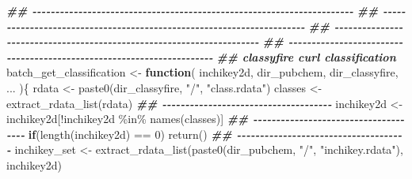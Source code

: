 \documentclass[
]{article}
\newenvironment{Shaded}{\begin{snugshade}}{\end{snugshade}}
\newcommand{\ControlFlowTok}[1]{\textcolor[rgb]{0.13,0.29,0.53}{\textbf{#1}}}
\newcommand{\DecValTok}[1]{\textcolor[rgb]{0.00,0.00,0.81}{#1}}
\newcommand{\DocumentationTok}[1]{\textcolor[rgb]{0.56,0.35,0.01}{\textbf{\textit{#1}}}}
\newcommand{\FunctionTok}[1]{\textcolor[rgb]{0.00,0.00,0.00}{#1}}
\newcommand{\NormalTok}[1]{#1}
\newcommand{\OtherTok}[1]{\textcolor[rgb]{0.56,0.35,0.01}{#1}}
\newcommand{\SpecialCharTok}[1]{\textcolor[rgb]{0.00,0.00,0.00}{#1}}
\newcommand{\StringTok}[1]{\textcolor[rgb]{0.31,0.60,0.02}{#1}}
\begin{document}
\begin{Shaded}
\begin{Highlighting}[]
\DocumentationTok{\#\# {-}{-}{-}{-}{-}{-}{-}{-}{-}{-}{-}{-}{-}{-}{-}{-}{-}{-}{-}{-}{-}{-}{-}{-}{-}{-}{-}{-}{-}{-}{-}{-}{-}{-}{-}{-}{-}{-}{-}{-}{-}{-}{-}{-}{-}{-}{-}{-}{-}{-}{-}{-}{-}{-}{-}{-}{-}{-}{-}{-}{-}{-}{-}{-}{-}{-}{-}{-}{-}{-} }
\DocumentationTok{\#\# {-}{-}{-}{-}{-}{-}{-}{-}{-}{-}{-}{-}{-}{-}{-}{-}{-}{-}{-}{-}{-}{-}{-}{-}{-}{-}{-}{-}{-}{-}{-}{-}{-}{-}{-}{-}{-}{-}{-}{-}{-}{-}{-}{-}{-}{-}{-}{-}{-}{-}{-}{-}{-}{-}{-}{-}{-}{-}{-}{-}{-}{-}{-}{-}{-}{-}{-}{-}{-}{-} }
\DocumentationTok{\#\# {-}{-}{-}{-}{-}{-}{-}{-}{-}{-}{-}{-}{-}{-}{-}{-}{-}{-}{-}{-}{-}{-}{-}{-}{-}{-}{-}{-}{-}{-}{-}{-}{-}{-}{-}{-}{-}{-}{-}{-}{-}{-}{-}{-}{-}{-}{-}{-}{-}{-}{-}{-}{-}{-}{-}{-}{-}{-}{-}{-}{-}{-}{-}{-}{-}{-}{-}{-}{-}{-} }
\DocumentationTok{\#\# {-}{-}{-}{-}{-}{-}{-}{-}{-}{-}{-}{-}{-}{-}{-}{-}{-}{-}{-}{-}{-}{-}{-}{-}{-}{-}{-}{-}{-}{-}{-}{-}{-}{-}{-}{-}{-}{-}{-}{-}{-}{-}{-}{-}{-}{-}{-}{-}{-}{-}{-}{-}{-}{-}{-}{-}{-}{-}{-}{-}{-}{-}{-}{-}{-}{-}{-}{-}{-}{-} }
\DocumentationTok{\#\# classyfire curl classification}
\NormalTok{batch\_get\_classification }\OtherTok{\textless{}{-}} 
  \ControlFlowTok{function}\NormalTok{(}
\NormalTok{           inchikey2d,}
\NormalTok{           dir\_pubchem,}
\NormalTok{           dir\_classyfire,}
\NormalTok{           ...}
\NormalTok{           )\{}
\NormalTok{    rdata }\OtherTok{\textless{}{-}} \FunctionTok{paste0}\NormalTok{(dir\_classyfire, }\StringTok{"/"}\NormalTok{, }\StringTok{"class.rdata"}\NormalTok{)}
\NormalTok{    classes }\OtherTok{\textless{}{-}} \FunctionTok{extract\_rdata\_list}\NormalTok{(rdata)}
    \DocumentationTok{\#\# {-}{-}{-}{-}{-}{-}{-}{-}{-}{-}{-}{-}{-}{-}{-}{-}{-}{-}{-}{-}{-}{-}{-}{-}{-}{-}{-}{-}{-}{-}{-}{-}{-}{-}{-}{-}{-} }
\NormalTok{    inchikey2d }\OtherTok{\textless{}{-}}\NormalTok{ inchikey2d[}\SpecialCharTok{!}\NormalTok{inchikey2d }\SpecialCharTok{\%in\%} \FunctionTok{names}\NormalTok{(classes)]}
    \DocumentationTok{\#\# {-}{-}{-}{-}{-}{-}{-}{-}{-}{-}{-}{-}{-}{-}{-}{-}{-}{-}{-}{-}{-}{-}{-}{-}{-}{-}{-}{-}{-}{-}{-}{-}{-}{-}{-}{-}{-} }
    \ControlFlowTok{if}\NormalTok{(}\FunctionTok{length}\NormalTok{(inchikey2d) }\SpecialCharTok{==} \DecValTok{0}\NormalTok{)}
      \FunctionTok{return}\NormalTok{()}
    \DocumentationTok{\#\# {-}{-}{-}{-}{-}{-}{-}{-}{-}{-}{-}{-}{-}{-}{-}{-}{-}{-}{-}{-}{-}{-}{-}{-}{-}{-}{-}{-}{-}{-}{-}{-}{-}{-}{-}{-}{-} }
\NormalTok{    inchikey\_set }\OtherTok{\textless{}{-}} \FunctionTok{extract\_rdata\_list}\NormalTok{(}\FunctionTok{paste0}\NormalTok{(dir\_pubchem, }\StringTok{"/"}\NormalTok{, }\StringTok{"inchikey.rdata"}\NormalTok{), inchikey2d)}

\end{Highlighting}
\end{Shaded}
\end{document}
